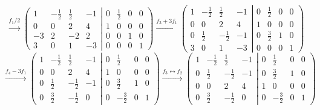 \documentclass[a4paper,12pt]{article}
\begin{document}
$$
\xrightarrow[]{f_1/2}
\left ( \left.\begin{matrix}
    1 & -\frac{1}{2} & \frac{1}{2} & -1 \\ 
    0 & 0 & 2 & 4 \\ 
    -3 & 2 & -2 & 2 \\
    3 & 0 & 1 & -3
    \end{matrix}\right| \begin{matrix}
    0 & \frac{1}{2} & 0 & 0 \\ 
    1 & 0 & 0 & 0 \\ 
    0 & 0 & 1 & 0 \\
    0 & 0 & 0 & 1
    \end{matrix}\right )
\xrightarrow[]{f_3+3f_1}
\left ( \left.\begin{matrix}
    1 & -\frac{1}{2} & \frac{1}{2} & -1 \\ 
    0 & 0 & 2 & 4 \\ 
    0 & \frac{1}{2} & -\frac{1}{2} & -1 \\
    3 & 0 & 1 & -3
    \end{matrix}\right| \begin{matrix}
    0 & \frac{1}{2} & 0 & 0 \\ 
    1 & 0 & 0 & 0 \\ 
    0 & \frac{3}{2} & 1 & 0 \\
    0 & 0 & 0 & 1
    \end{matrix}\right )
$$
$$
\xrightarrow[]{f_4-3f_1}
\left ( \left.\begin{matrix}
    1 & -\frac{1}{2} & \frac{1}{2} & -1 \\ 
    0 & 0 & 2 & 4 \\ 
    0 & \frac{1}{2} & -\frac{1}{2} & -1 \\
    0 & \frac{3}{2} & -\frac{1}{2} & 0
    \end{matrix}\right| \begin{matrix}
    0 & \frac{1}{2} & 0 & 0 \\ 
    1 & 0 & 0 & 0 \\ 
    0 & \frac{3}{2} & 1 & 0 \\
    0 & -\frac{3}{2} & 0 & 1
    \end{matrix}\right )
\xrightarrow[]{f_3 \leftrightarrow f_2}
\left ( \left.\begin{matrix}
    1 & -\frac{1}{2} & \frac{1}{2} & -1 \\ 
    0 & \frac{1}{2} & -\frac{1}{2} & -1 \\
    0 & 0 & 2 & 4 \\ 
    0 & \frac{3}{2} & -\frac{1}{2} & 0
    \end{matrix}\right| \begin{matrix}
    0 & \frac{1}{2} & 0 & 0 \\ 
    0 & \frac{3}{2} & 1 & 0 \\
    1 & 0 & 0 & 0 \\ 
    0 & -\frac{3}{2} & 0 & 1
    \end{matrix}\right )
$$
\end{document}
